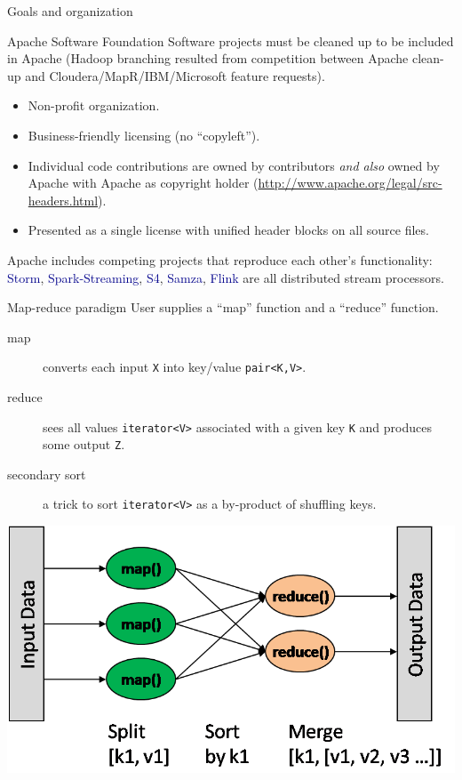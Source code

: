 \documentclass{beamer}
\begin{document}
\begin{frame}{Goals and organization}

\begin{block}{Apache Software Foundation}
Software projects must be cleaned up to be included in Apache (Hadoop branching resulted from competition between Apache clean-up and Cloudera/MapR/IBM/Microsoft feature requests).

\begin{itemize}
\item Non-profit organization.
\item Business-friendly licensing (no ``copyleft'').
\item Individual code contributions are owned by contributors {\it and also} owned by Apache with Apache as copyright holder (\url{http://www.apache.org/legal/src-headers.html}).
\item Presented as a single license with unified header blocks on all source files.
\end{itemize}

Apache includes competing projects that reproduce each other's functionality: \textcolor{darkblue}{Storm}, \textcolor{darkblue}{Spark-Streaming}, \textcolor{darkblue}{S4}, \textcolor{darkblue}{Samza}, \textcolor{darkblue}{Flink} are all distributed stream processors.
\end{block}
\end{frame}

\begin{frame}{Map-reduce paradigm}
User supplies a ``map'' function and a ``reduce'' function.
\begin{description}
\item[map] converts each input {\tt X} into key/value {\tt pair<K,V>}.
\item[reduce] sees all values {\tt iterator<V>} associated with a given key {\tt K} and produces some output {\tt Z}.
\item[secondary sort] a trick to sort {\tt iterator<V>} as a by-product of shuffling keys.
\end{description}

\begin{center}
\includegraphics[width=0.65\linewidth]{map-reduce.png}
\end{center}
\end{frame}
\end{document}
